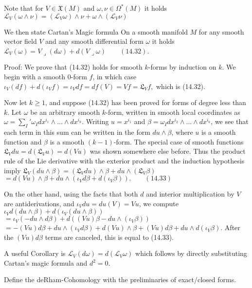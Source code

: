 Note that for \( V \in \mathfrak{X}(M) \) and \( \omega, \nu \in \Omega^\ast(M) \)
it holds
\( \mathcal{L}_{V}(\omega \wedge \nu) = (\mathcal{L}_{V} \omega) \wedge \nu + \omega \wedge (\mathcal{L}_{V}\nu) \)

We then state Cartan's Magic formula
On a smooth manifold \( M \) for any smooth vector field \( V \) and any smooth differential form \( \omega \)
it holds
\( \mathcal{L}_{V}(\omega) = V \lrcorner(d\omega) + d(V \lrcorner \omega) \qquad (14.32) \).

Proof:
We prove that (14.32) holds for smooth \(k\)-forms by induction on \(k\). 
We begin with a smooth 0-form \(f\), in which case
\(\iota_V (df) + d(\iota_V f) = \iota_V df = df(V) = Vf = \mathfrak{L}_V f,\)
which is (14.32).

Now let \(k \geq 1\), and suppose (14.32) has been proved for forms of degree less 
than \(k\). Let \(\omega\) be an arbitrary smooth \(k\)-form, written in smooth local coordinates as
\(\omega = \sum_I' \omega_I dx^{i_1} \wedge \dots \wedge dx^{i_k}.\)
Writing \(u = x^{i_1}\) and \(\beta = \omega_I dx^{i_2} \wedge \dots \wedge dx^{i_k}\), we see that each term in this sum 
can be written in the form \(du \wedge \beta\), where \(u\) is a smooth function and \(\beta\) is a
smooth \((k-1)\)-form. The special case of smooth functions \(\mathfrak{L}_V du = d(\mathfrak{L}_V u) = d(Vu)\) was shown somewhere else before. 
Thus the product rule of the Lie derivative with the exterior product and the induction hypothesis imply
\(\mathfrak{L}_V (du \wedge \beta) = (\mathfrak{L}_V du) \wedge \beta + du \wedge (\mathfrak{L}_V \beta) \)
\(= d(Vu) \wedge \beta + du \wedge (\iota_V d\beta + d(\iota_V \beta)). \qquad (14.33) \)

On the other hand, using the facts that both \(d\) and interior multiplication by \(V\) are
antiderivations, and \(\iota_V du = du(V) = Vu\), we compute
\(\iota_V d(du \wedge \beta) + d(\iota_V (du \wedge \beta))\)
\(= \iota_V (-du \wedge d\beta) + d((Vu)\beta - du \wedge (\iota_V \beta))\)
\(= -(Vu)d\beta + du \wedge (\iota_V d\beta) + d(Vu) \wedge \beta + (Vu)d\beta + du \wedge d(\iota_V \beta).\)
After the \((Vu)d\beta\) terms are canceled, this is equal to (14.33). \qquad \square

A useful Corollary is \( \mathcal{L}_V(d\omega) = d(\mathcal{L}_V \omega) \)
which follows by directly substituting Cartan's magic formula and \( d^2 = 0 \).


Define the deRham-Cohomology with the preliminaries of exact/closed forms.

